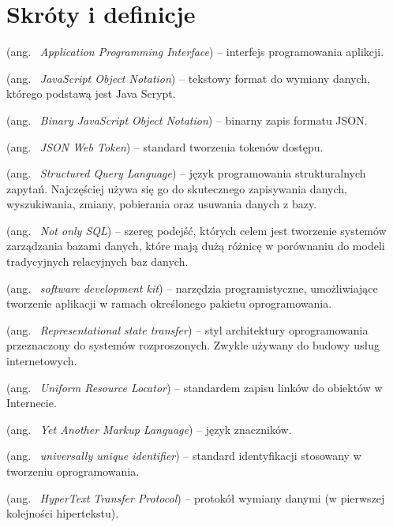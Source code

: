 \chapter*{Skróty i definicje}\mbox{}
\label{sec:skroty}
\noindent
\begin{description}[labelwidth=*]
  \item [API] (ang. \ \emph{Application Programming Interface}) -- interfejs programowania aplikcji.
  \item [JSON] (ang. \ \emph{JavaScript Object Notation}) -- tekstowy format do wymiany danych, którego podstawą jest Java Scrypt.
  \item [BSON] (ang. \ \emph{Binary JavaScript Object Notation}) -- binarny zapis formatu JSON.
  \item [JWT] (ang. \ \emph{JSON Web Token}) -- standard tworzenia tokenów dostępu.
  \item [SQL] (ang. \ \emph{Structured Query Language}) -- język programowania strukturalnych zapytań. Najczęściej używa się go do skutecznego zapisywania danych, wyszukiwania, zmiany, pobierania oraz usuwania danych z bazy. 
  \item [NoSQL] (ang. \ \emph{Not only SQL}) -- szereg podejść, których celem jest tworzenie systemów zarządzania bazami danych, które mają dużą różnicę w porównaniu do modeli tradycyjnych relacyjnych baz danych.
  \item [SDK] (ang. \ \emph{software development kit}) -- narzędzia programistyczne, umożliwiające tworzenie aplikacji w ramach określonego pakietu oprogramowania.
  \item [Rest] (ang. \ \emph{Representational state transfer}) -- styl architektury oprogramowania przeznaczony do systemów rozproszonych. Zwykle używany do budowy usług internetowych.
  \item [URL] (ang. \ \emph{Uniform Resource Locator}) -- standardem zapisu linków do obiektów w Internecie.
  \item [YAML] (ang. \ \emph{Yet Another Markup Language}) -- język znaczników.
  \item [UUID] (ang. \ \emph{universally unique identifier}) -- standard identyfikacji stosowany w tworzeniu oprogramowania.
  \item [HTTP] (ang. \ \emph{HyperText Transfer Protocol}) -- protokół wymiany danymi (w pierwszej kolejności hipertekstu).
\end{description}